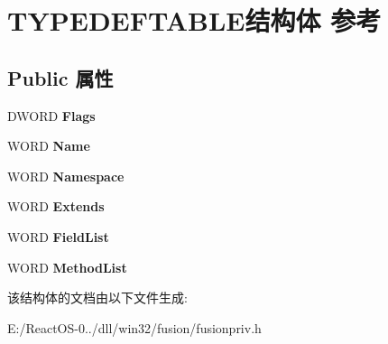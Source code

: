 \hypertarget{struct_t_y_p_e_d_e_f_t_a_b_l_e}{}\section{T\+Y\+P\+E\+D\+E\+F\+T\+A\+B\+L\+E结构体 参考}
\label{struct_t_y_p_e_d_e_f_t_a_b_l_e}
\subsection*{Public 属性}
\begin{DoxyCompactItemize}
\item 
\mbox{\label{struct_t_y_p_e_d_e_f_t_a_b_l_e_a381793e5f7a4701da0d03d5485b9e83c}} 
D\+W\+O\+RD {\bfseries Flags}
\item 
\mbox{\label{struct_t_y_p_e_d_e_f_t_a_b_l_e_a7684f8e9f3ea0a2a49b7261aee529a36}} 
W\+O\+RD {\bfseries Name}
\item 
\mbox{\label{struct_t_y_p_e_d_e_f_t_a_b_l_e_aabe7491a581d1bb3b666e3c4fb1e7623}} 
W\+O\+RD {\bfseries Namespace}
\item 
\mbox{\label{struct_t_y_p_e_d_e_f_t_a_b_l_e_a523568576dc68ac5b069635e00f46907}} 
W\+O\+RD {\bfseries Extends}
\item 
\mbox{\label{struct_t_y_p_e_d_e_f_t_a_b_l_e_a5dad6acd390ecc4598c0e1cff8a867bd}} 
W\+O\+RD {\bfseries Field\+List}
\item 
\mbox{\label{struct_t_y_p_e_d_e_f_t_a_b_l_e_ad27ead7d121616de61b39fd683e3e94b}} 
W\+O\+RD {\bfseries Method\+List}
\end{DoxyCompactItemize}


该结构体的文档由以下文件生成\+:\begin{DoxyCompactItemize}
\item 
E\+:/\+React\+O\+S-\/0../dll/win32/fusion/fusionpriv.\+h\end{DoxyCompactItemize}
